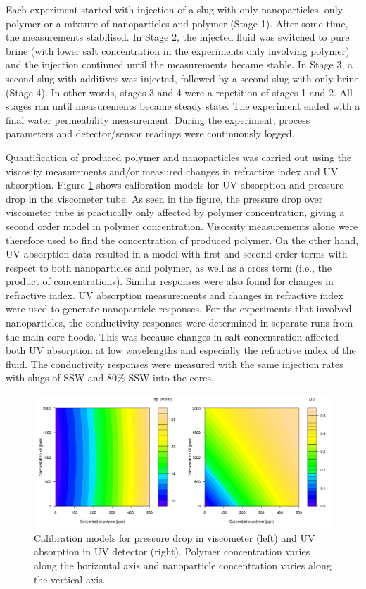 Each experiment started with injection of a slug with only nanoparticles, only polymer or a mixture of nanoparticles and polymer (Stage 1). After some time, the measurements stabilised. In Stage 2, the injected fluid was switched to pure brine (with lower salt concentration in the experiments only involving polymer) and the injection continued until the measurements became stable. In Stage 3, a second slug with additives was injected, followed by a second slug with only brine (Stage 4). In other words, stages 3 and 4 were a repetition of stages 1 and 2. All stages ran until measurements became steady state. The experiment ended with a final water permeability measurement. During the experiment, process parameters and detector/sensor readings were continuously logged.

Quantification of produced polymer and nanoparticles was carried out using the viscosity measurements and/or measured changes in refractive index and UV absorption. Figure \ref{cht:uv} shows calibration models for UV absorption  and pressure drop in the viscometer tube. As seen in the figure, the pressure drop over viscometer tube is practically only affected by polymer concentration, giving a second order model in polymer concentration. Viscosity measurements alone were therefore used to find the concentration of produced polymer. On the other hand, UV absorption data resulted in a model with first and second order terms with respect to both nanoparticles and polymer, as well as a cross term (i.e., the product of concentrations). Similar responses were also found for changes in  refractive index. UV absorption measurements and changes in refractive index were used to generate nanoparticle responses. For the experiments that involved nanoparticles, the conductivity responses were determined in separate runs from the main core floods. This was because changes in salt concentration affected both UV absorption at low wavelengths and especially the refractive index of the fluid. The conductivity responses were measured with the same injection rates with slugs of SSW and 80\% SSW into the cores.

\begin{figure}[h]
    \centering
    \includegraphics[width=\textwidth]{img/cht/uvDetector.png}
    \caption{Calibration models for pressure drop in viscometer (left) and UV absorption in UV detector (right). Polymer concentration varies along the horizontal axis and nanoparticle concentration varies along the vertical axis.}
    \label{cht:uv}
\end{figure}

